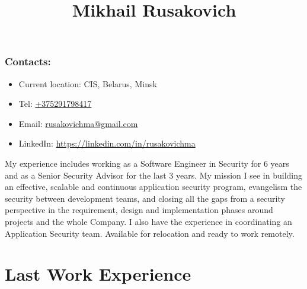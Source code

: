 \documentclass[a4paper, 12pt]{article}
\title{Mikhail Rusakovich}
\author{}
\date{}
\begin{document}
\maketitle

\subsubsection*{Contacts:}
\begin{itemize}
	\item Current location: CIS, Belarus, Minsk
    \item Tel: \href{tel:+375291798417}{+375291798417}
    \item Email: \href{mailto:rusakovichma@gmail.com}{rusakovichma@gmail.com}
    \item LinkedIn: \href{https://linkedin.com/in/rusakovichma
}{https://linkedin.com/in/rusakovichma}
\end{itemize}

My experience includes working as a Software Engineer in Security for 6 years and as a Senior Security Advisor for the last 3 years. 
\newline
\newline
My mission I see in building an effective, scalable and continuous application security program, evangelism the security between development teams, and closing all the gaps from a security perspective in the requirement, design and implementation phases around projects and the whole Company.
\newline
\newline
I also have the experience in coordinating an Application Security team. 
\newline
\newline
Available for relocation and ready to work remotely.


\section*{Last Work Experience}
\end{document}
